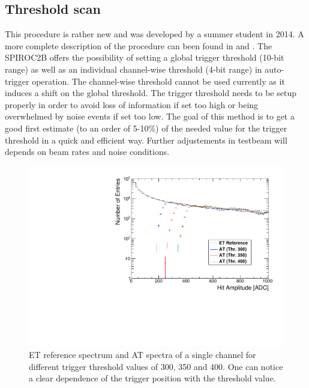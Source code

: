 \subsection{Threshold scan}

This procedure is rather new and was developed by a summer student in 2014. A more complete description of the procedure can been found in \cite{Hartbrich:2016bbz} and \cite{LloydTrigger}. The SPIROC2B offers the possibility of setting a global trigger threshold (10-bit range) as well as an individual channel-wise threshold (4-bit range) in auto-trigger operation. The channel-wise threshold cannot be used currently as it induces a shift on the global threshold. The trigger threshold needs to be setup properly in order to avoid loss of information if set too high or being overwhelmed by noise events if set too low. The goal of this method is to get a good first estimate (to an order of 5-10\%) of the needed value for the trigger threshold in a quick and efficient way. Further adjustements in testbeam will depends on beam rates and noise conditions.
\begin{figure}[htbp!]
  \centering
  \includegraphics[width=0.6\linewidth]{../Thesis_Plots/Commissioning/Plots/SpectraADC_HBU2_12.pdf}
  \caption{ET reference spectrum and AT spectra of a single channel for different trigger threshold values of 300, 350 and 400. One can notice a clear dependence of the trigger position with the threshold value.} \label{fig:ADCTriggerThreshold}
\end{figure}


